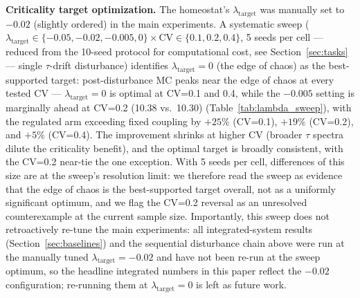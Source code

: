 \documentclass[11pt]{article}
\begin{document}
\textbf{Criticality target optimization.} The homeostat's
$\lambda_{\mathrm{target}}$ was manually set to $-0.02$ (slightly ordered)
in the main experiments. A systematic sweep
($\lambda_{\mathrm{target}}\in\{-0.05,-0.02,-0.005,0\}\times\mathrm{CV}\in\{0.1,0.2,0.4\}$,
5 seeds per cell --- reduced from the 10-seed protocol for computational
cost, see Section~\ref{sec:tasks} --- single $\tau$-drift disturbance) identifies
$\lambda_{\mathrm{target}}{=}0$ (the edge of chaos) as the best-supported
target: post-disturbance
MC peaks near the edge of chaos at every tested CV --- $\lambda_{\mathrm{target}}{=}0$
is optimal at CV=0.1 and 0.4, while the $-0.005$ setting is marginally
ahead at CV=0.2 (10.38 vs.\ 10.30) (Table~\ref{tab:lambda_sweep}), with the
regulated arm exceeding fixed coupling by $+25\%$ (CV=0.1), $+19\%$
(CV=0.2), and $+5\%$ (CV=0.4). The improvement
shrinks at higher CV (broader $\tau$ spectra dilute the criticality benefit),
and the optimal target is broadly consistent, with the CV=0.2 near-tie the
one exception. With 5 seeds per cell, differences of this size are at the
sweep's resolution limit: we therefore read the sweep as evidence that the
edge of chaos is the best-supported target overall, not as a uniformly
significant optimum, and we flag the CV=0.2 reversal as an unresolved
counterexample at the current sample size. Importantly, this sweep does not
retroactively re-tune the main experiments: all integrated-system results
(Section~\ref{sec:baselines}) and the sequential disturbance chain above were
run at the manually tuned $\lambda_{\mathrm{target}}{=}-0.02$ and have not
been re-run at the sweep optimum, so the headline integrated numbers in this
paper reflect the $-0.02$ configuration; re-running them at
$\lambda_{\mathrm{target}}{=}0$ is left as future work.
\end{document}
